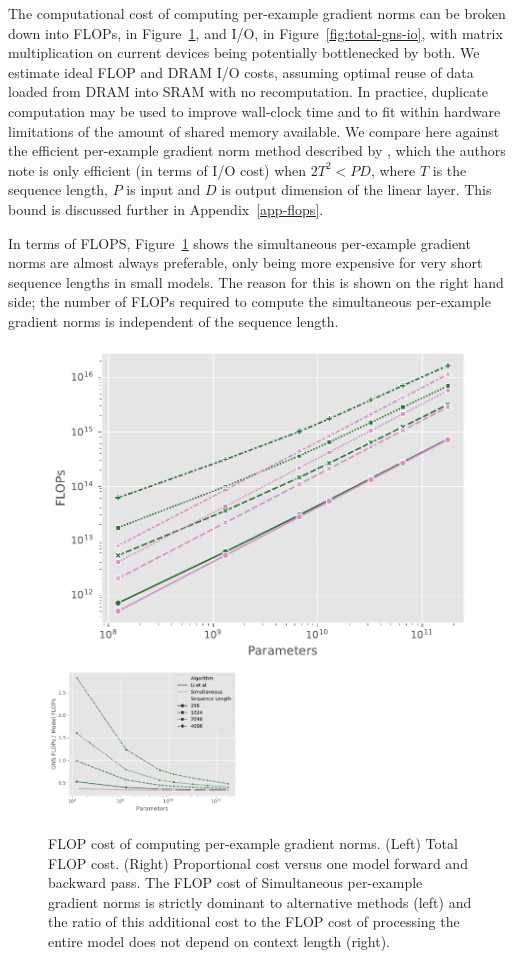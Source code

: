 \documentclass{article}
\begin{document}
The computational cost of computing per-example gradient norms can be broken
down into FLOPs, in Figure~\ref{fig:gns-flops}, and I/O, in
Figure~\ref{fig:total-gns-io}, with matrix multiplication on current devices
being potentially bottlenecked by both. We estimate ideal FLOP and DRAM I/O
costs, assuming optimal reuse of data loaded from DRAM into SRAM with no
recomputation. In practice, duplicate computation may be used to improve
wall-clock time and to fit within hardware limitations of the amount of shared
memory available. We compare here against the efficient per-example gradient
norm method described by \citet{li2022large}, which the authors note is only
efficient (in terms of I/O cost) when $2 T^2 < P D$, where $T$ is the sequence
length, $P$ is input and $D$ is output dimension of the linear layer. This
bound is discussed further in Appendix~\ref{app-flops}.


In terms of FLOPS, Figure~\ref{fig:gns-flops} shows the simultaneous
per-example gradient norms are almost always preferable, only being more expensive
for very short sequence lengths in small models. The reason for this is shown
on the right hand side; the number of FLOPs required to compute the simultaneous
per-example gradient norms is independent of the sequence length.

\begin{figure}
    \centering
    \includegraphics[width=0.45\linewidth]{figures/total-flops-grads-and-gns.pdf}
    \quad
    \includegraphics[width=0.45\textwidth]{figures/prop-flops-grads-and-gns.pdf}
    \caption{%
        FLOP cost of computing per-example gradient norms. (Left) Total FLOP
        cost. (Right) Proportional cost versus one model forward and backward
        pass. The FLOP cost of Simultaneous per-example gradient norms is
        strictly dominant to alternative methods (left) and the ratio of this
        additional cost to the FLOP cost of processing the entire model does not
        depend on context length (right).}
    \label{fig:gns-flops}
\end{figure}
\end{document}
